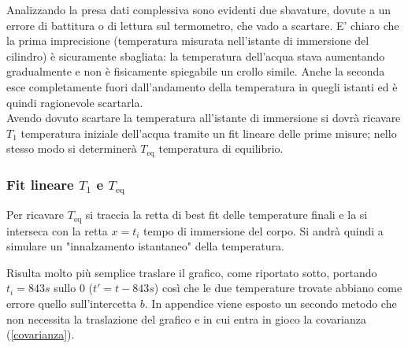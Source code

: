 \documentclass{article}
\begin{document}
\begin{center}
\begin{figure}[H]
		\end{figure}
	\end{center}
	
	Analizzando la presa dati complessiva sono evidenti due sbavature, dovute a un errore di battitura o di lettura sul termometro, che vado a scartare. E' chiaro che la prima imprecisione (temperatura misurata nell'istante di immersione del cilindro) è sicuramente sbagliata: la temperatura dell'acqua stava aumentando gradualmente e non è fisicamente spiegabile un crollo simile. Anche la seconda esce completamente fuori dall'andamento della temperatura in quegli istanti ed è quindi ragionevole scartarla. \\
	
	\noindent
	Avendo dovuto scartare la temperatura all'istante di immersione si dovrà ricavare \(T_{1}\) temperatura iniziale dell'acqua tramite un fit lineare delle prime misure; nello stesso modo si determinerà \(T_{\text{eq}}\) temperatura di equilibrio.
	
	\subsubsection{Fit lineare \(T_{1}\) e \(T_{\text{eq}}\)}
	Per ricavare \(T_{\text{eq}}\) si traccia  la retta di best fit delle temperature finali e la si interseca con la retta \(x=t_{i}\) tempo di immersione del corpo. Si andrà quindi a simulare un "innalzamento istantaneo" della temperatura. 
	
	Risulta molto più semplice traslare il grafico, come riportato sotto, portando \(t_{i} = 843 s\) sullo \(0\) (\(t' = t - 843s\)) così che le due temperature trovate abbiano come errore quello sull'intercetta \(b\). In appendice viene esposto un secondo metodo che non necessita la traslazione del grafico e in cui entra in gioco la covarianza (\ref{covarianza}). \\
	
\end{document}
